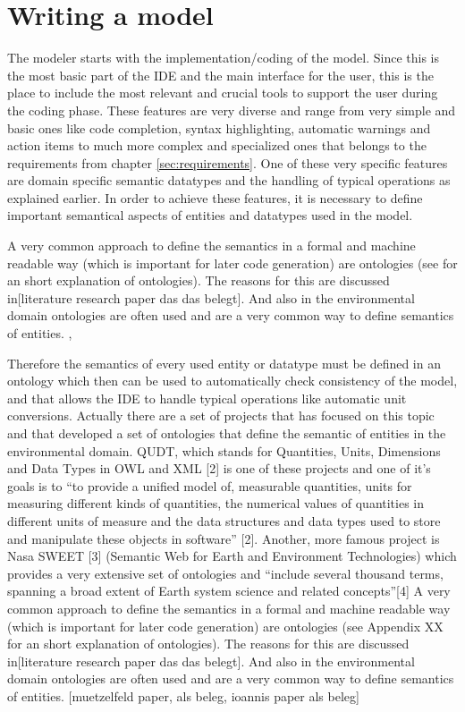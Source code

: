 \section{Writing a model}
The modeler starts with the implementation/coding of the model. Since this is the most basic part of the IDE and the main interface for the user, this is the place to include the most relevant and crucial tools to support the user during the coding phase. These features are very diverse and range from very simple and basic ones like code completion, syntax highlighting, automatic warnings and action items to much more complex and specialized ones that belongs to the requirements from chapter \ref{sec:requirements}. One of these very specific features are domain specific semantic datatypes and the handling of typical operations as explained earlier. In order to achieve these features, it is necessary to define important semantical aspects of entities and datatypes used in the model.


A very common approach to define the semantics in a formal and machine readable way (which is important for later code generation) are ontologies (see  for an short explanation of ontologies). The reasons for this are discussed in[literature research paper das das belegt]. And also in the environmental domain ontologies are often used and are a very common way to define semantics of entities. \autocite{dsl:muetzelfeldt}, \autocite{Villa2009577}


Therefore the semantics of every used entity or datatype must be defined in an ontology which then can be used to automatically check consistency of the model, and that allows the IDE to handle typical operations like automatic unit conversions. Actually there are a set of projects that has focused on this topic  and that developed a set of ontologies that define the semantic of entities in the environmental domain.  QUDT, which stands for Quantities, Units, Dimensions and Data Types in OWL and XML [2] is one of these projects and one of it’s goals is to “to provide a unified model of, measurable quantities, units for measuring different kinds of quantities, the numerical values of quantities in different units of measure and the data structures and data types used to store and manipulate these objects in software” [2]. Another, more famous project is Nasa SWEET [3] (Semantic Web for Earth and Environment Technologies) which provides a very extensive set of ontologies and “include several thousand terms, spanning a broad extent of Earth system science and related concepts”[4]
A very common approach to define the semantics in a formal and machine readable way (which is important for later code generation) are ontologies (see Appendix XX for an short explanation of ontologies). The reasons for this are discussed in[literature research paper das das belegt]. And also in the environmental domain ontologies are often used and are a very common way to define semantics of entities. [muetzelfeld paper, als beleg, ioannis paper als beleg] 


